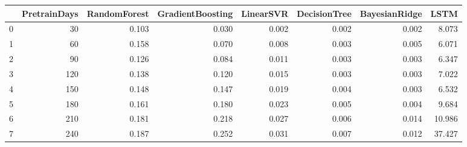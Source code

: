 \begin{tabular}{lrrrrrrr}
\toprule
{} &  PretrainDays &  RandomForest &  GradientBoosting &  LinearSVR &  DecisionTree &  BayesianRidge &   LSTM \\
\midrule
0 &            30 &         0.103 &             0.030 &      0.002 &         0.002 &          0.002 &  8.073 \\
1 &            60 &         0.158 &             0.070 &      0.008 &         0.003 &          0.005 &  6.071 \\
2 &            90 &         0.126 &             0.084 &      0.011 &         0.003 &          0.003 &  6.347 \\
3 &           120 &         0.138 &             0.120 &      0.015 &         0.003 &          0.003 &  7.022 \\
4 &           150 &         0.148 &             0.147 &      0.019 &         0.004 &          0.003 &  6.532 \\
5 &           180 &         0.161 &             0.180 &      0.023 &         0.005 &          0.004 &  9.684 \\
6 &           210 &         0.181 &             0.218 &      0.027 &         0.006 &          0.014 & 10.986 \\
7 &           240 &         0.187 &             0.252 &      0.031 &         0.007 &          0.012 & 37.427 \\
\bottomrule
\end{tabular}

